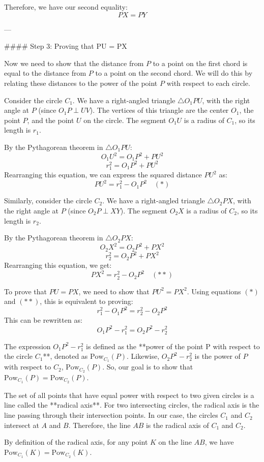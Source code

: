 Therefore, we have our second equality:
$$PX = PY$$

---

#### Step 3: Proving that PU = PX

Now we need to show that the distance from $P$ to a point on the first chord is equal to the distance from $P$ to a point on the second chord. We will do this by relating these distances to the power of the point $P$ with respect to each circle.

Consider the circle $C_1$. We have a right-angled triangle $\triangle O_1PU$, with the right angle at $P$ (since $O_1P \perp UV$). The vertices of this triangle are the center $O_1$, the point $P$, and the point $U$ on the circle. The segment $O_1U$ is a radius of $C_1$, so its length is $r_1$.

By the Pythagorean theorem in $\triangle O_1PU$:
$$O_1U^2 = O_1P^2 + PU^2$$
$$r_1^2 = O_1P^2 + PU^2$$
Rearranging this equation, we can express the squared distance $PU^2$ as:
$$PU^2 = r_1^2 - O_1P^2 \quad (*)$$

Similarly, consider the circle $C_2$. We have a right-angled triangle $\triangle O_2PX$, with the right angle at $P$ (since $O_2P \perp XY$). The segment $O_2X$ is a radius of $C_2$, so its length is $r_2$.

By the Pythagorean theorem in $\triangle O_2PX$:
$$O_2X^2 = O_2P^2 + PX^2$$
$$r_2^2 = O_2P^2 + PX^2$$
Rearranging this equation, we get:
$$PX^2 = r_2^2 - O_2P^2 \quad (**)$$

To prove that $PU = PX$, we need to show that $PU^2 = PX^2$. Using equations $(*)$ and $(**)$, this is equivalent to proving:
$$r_1^2 - O_1P^2 = r_2^2 - O_2P^2$$
This can be rewritten as:
$$O_1P^2 - r_1^2 = O_2P^2 - r_2^2$$

The expression $O_1P^2 - r_1^2$ is defined as the **power of the point P with respect to the circle $C_1$**, denoted as $\text{Pow}_{C_1}(P)$. Likewise, $O_2P^2 - r_2^2$ is the power of $P$ with respect to $C_2$, $\text{Pow}_{C_2}(P)$. So, our goal is to show that $\text{Pow}_{C_1}(P) = \text{Pow}_{C_2}(P)$.

The set of all points that have equal power with respect to two given circles is a line called the **radical axis**. For two intersecting circles, the radical axis is the line passing through their intersection points. In our case, the circles $C_1$ and $C_2$ intersect at $A$ and $B$. Therefore, the line $AB$ is the radical axis of $C_1$ and $C_2$.

By definition of the radical axis, for any point $K$ on the line $AB$, we have $\text{Pow}_{C_1}(K) = \text{Pow}_{C_2}(K)$.

